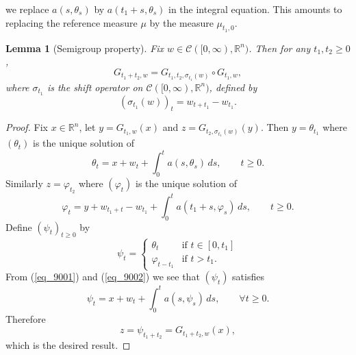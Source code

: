 \documentclass[12pt,a4paper]{article}
\newcommand{\R}{\mathbb{R}}
\renewcommand{\phi}{\varphi}
\newtheorem{lemma}[theorem]{Lemma}
\theoremstyle{definition}
\begin{document}
we replace $a(s, \theta_s )$ by $a(t_1 + s , \theta_s )$
in the integral equation.
This amounts to replacing the reference measure $\mu$ by the
measure $\mu_{t_1,0}$.
%
\begin{lemma}[Semigroup property] \label{lem_6734}
Fix $w \in \mathcal C ( [0,\infty) , \R^n )$. Then for any $t_1,t_2\geq0$, 
\[
G_{t_1+t_2,w} = G_{t_1, t_2 , \sigma_{t_1}(w)} \circ G_{t_1,w},
\]
where $\sigma_{t_1}$ is the shift operator on $\mathcal C ( [0,\infty) , \R^n )$, defined by
\[
(\sigma_{t_1} (w))_t = w_{t+t_1} - w_{t_1} .
\]
\end{lemma}
%
\begin{proof}
Fix $x \in \R^n$, let $y = G_{t_1,w} (x)$ and $z = G_{t_2,\sigma_{t_1} (w)} (y)$. Then $y = \theta_{t_1}$ where
$(\theta_t)$ is the unique solution of
\begin{equation} \label{eq_9001}
\theta_t = x + w_t + \int_0^t a(s,\theta_s) \, ds , \qquad t \geq 0  .
\end{equation}
Similarly $z = \phi_{t_2}$ where $(\phi_{t})$ is the unique solution of
\begin{equation} \label{eq_9002}
\phi_t = y + w_{t_1+t} - w_{t_1} + \int_0^t a(t_1+s,\phi_s) \,ds , \qquad t \geq 0.
\end{equation}
Define $(\psi_t)_{t \geq 0}$ by
\[
\psi_t =
\begin{cases}
\theta_t & \text{if } t \in [0,t_1] \\
\phi_{t-t_1} & \text{if } t >  t_1 .
\end{cases}
\]
From (\ref{eq_9001}) and (\ref{eq_9002}) we  see that
$(\psi_t)$ satisfies
\[
\psi_t = x + w_t + \int_0^t a ( s, \psi_s ) \, ds , \qquad \forall t \geq 0.
\]
Therefore
\[
z = \psi_{t_1+t_2} = G_{t_1+t_2 , w} (x)  ,
\]
which is the desired result.
\end{proof}
\end{document}
